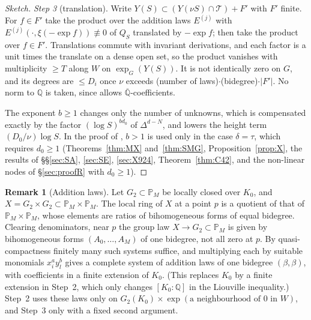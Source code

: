 \documentclass[11pt]{amsart}
\theoremstyle{definition}
\newtheorem{remark}[theorem]{Remark}
\newcommand{\Qb}{\overline{\mathbb{Q}}}
\newcommand{\Q}{\mathbb{Q}}
\begin{document}
\begin{proof}[Sketch]
\emph{Step 3} (translation). Write $Y(S)\subset(Y(\nu S)\cap\mathcal T)+F'$ with $F'$ finite. For $f\in F'$ take the
product over the addition laws $E^{(j)}$ with $E^{(j)}(\cdot,\xi(-\exp f))\not\equiv0$ of $Q_S$ translated by $-\exp f$;
then take the product over $f\in F'$. Translations commute with invariant derivations, and each factor is a unit times
the translate on a dense open set, so the product vanishes with multiplicity $\ge T$ along $W$ on $\exp_G(Y(S))$. It is
not identically zero on $G$, and its degrees are $\le D_i$ once $\nu$ exceeds (number of laws)$\cdot$(bidegree)$\cdot|F'|$.
No norm to $\Q$ is taken, since \cite[Prop.~6.1]{W88} allows $\Qb$-coefficients.

The exponent $b\ge1$ changes only the number of unknowns, which is compensated exactly by the factor $(\log S)^{bd_0}$ of
$\Delta^{d-N}$, and lowers the height term $(D_0/\nu)\log S$. In the proof of \cite[Thm.~4.1]{W88}, $b>1$ is used only in
the case $\delta=\tau$, which requires $d_0\ge1$ (Theorems~\ref{thm:MX} and~\ref{thm:SMG},
Proposition~\ref{prop:X}, the results of \S\S\ref{sec:SA}, \ref{sec:SE}, \ref{sec:X924}, Theorem~\ref{thm:C42}, and the
non-linear nodes of \S\ref{sec:proofR} with $d_0\ge1$).
\end{proof}

\begin{remark}[Addition laws]\label{rem:addition}
Let $G_2\subset\mathbb P_M$ be locally closed over $K_0$, and $X=G_2\times G_2\subset\mathbb P_M\times\mathbb P_M$. The local
ring of $X$ at a point $p$ is a quotient of that of $\mathbb P_M\times\mathbb P_M$, whose elements are ratios of
bihomogeneous forms of equal bidegree. Clearing denominators, near $p$ the group law $X\to G_2\subset\mathbb P_M$ is given
by bihomogeneous forms $(A_0,\dots,A_M)$ of one bidegree, not all zero at $p$. By quasi-compactness finitely many such
systems suffice, and multiplying each by suitable monomials $x_i^ay_l^b$ gives a complete system of addition laws of one
bidegree $(\beta,\beta)$, with coefficients in a finite extension of $K_0$. (This replaces $K_0$ by a finite extension in
Step~2, which only changes $[K_0:\Q]$ in the Liouville inequality.) Step~2 uses these laws only on
$G_2(K_0)\times\exp(\text{a neighbourhood of }0\text{ in }W)$, and Step~3 only with a fixed second argument.
\end{remark}
\end{document}
